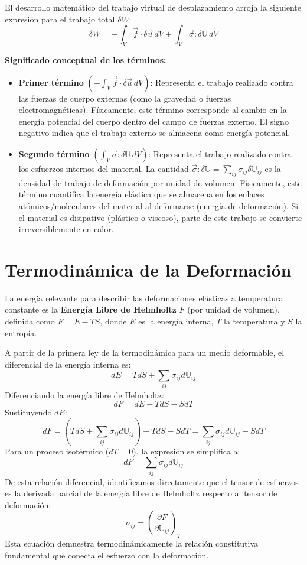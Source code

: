 El desarrollo matemático del trabajo virtual de desplazamiento arroja la siguiente expresión para el trabajo total $\delta W$:
$$ \delta W = -\int_V \vec{f} \cdot \delta\vec{u} \, dV + \int_V \vec{\sigma} : \delta\mathbb{U} \, dV $$

\textbf{Significado conceptual de los términos:}
\begin{itemize}
\item \textbf{Primer término} $\left( -\int_V \vec{f} \cdot \delta\vec{u} \, dV \right)$: Representa el trabajo realizado contra las fuerzas de cuerpo externas (como la gravedad o fuerzas electromagnéticas). Físicamente, este término corresponde al cambio en la energía potencial del cuerpo dentro del campo de fuerzas externo. El signo negativo indica que el trabajo externo se almacena como energía potencial.
\item \textbf{Segundo término} $\left( \int_V \vec{\sigma} : \delta\mathbb{U} \, dV \right)$: Representa el trabajo realizado contra los esfuerzos internos del material. La cantidad $\vec{\sigma} : \delta\mathbb{U} = \sum_{ij} \sigma_{ij} \delta\mathbb{U}_{ij}$ es la densidad de trabajo de deformación por unidad de volumen. Físicamente, este término cuantifica la energía elástica que se almacena en los enlaces atómicos/moleculares del material al deformarse (energía de deformación). Si el material es disipativo (plástico o viscoso), parte de este trabajo se convierte irreversiblemente en calor.
\end{itemize}

\section{Termodinámica de la Deformación}

La energía relevante para describir las deformaciones elásticas a temperatura constante es la \textbf{Energía Libre de Helmholtz} $F$ (por unidad de volumen), definida como $F = E - TS$, donde $E$ es la energía interna, $T$ la temperatura y $S$ la entropía.

A partir de la primera ley de la termodinámica para un medio deformable, el diferencial de la energía interna es:
$$ dE = T dS + \sum_{ij} \sigma_{ij} d\mathbb{U}_{ij} $$
Diferenciando la energía libre de Helmholtz:
$$ dF = dE - T dS - S dT $$
Sustituyendo $dE$:
$$ dF = (T dS + \sum_{ij} \sigma_{ij} d\mathbb{U}_{ij}) - T dS - S dT = \sum_{ij} \sigma_{ij} d\mathbb{U}_{ij} - S dT $$
Para un proceso isotérmico ($dT = 0$), la expresión se simplifica a:
$$ dF = \sum_{ij} \sigma_{ij} d\mathbb{U}_{ij} $$
De esta relación diferencial, identificamos directamente que el tensor de esfuerzos es la derivada parcial de la energía libre de Helmholtz respecto al tensor de deformación:
$$ \sigma_{ij} = \left( \frac{\partial F}{\partial \mathbb{U}_{ij}} \right)_T $$
Esta ecuación demuestra termodinámicamente la relación constitutiva fundamental que conecta el esfuerzo con la deformación.

